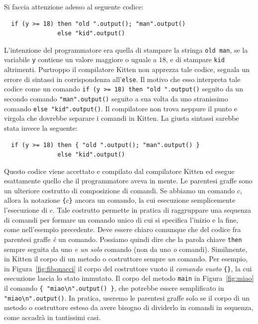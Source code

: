 Si faccia attenzione adesso al seguente codice:
%
\begin{verbatim}
  if (y >= 18) then "old ".output(); "man".output()
               else "kid".output()
\end{verbatim}
%
L'intenzione del programmatore era quella di stampare la stringa
\texttt{old man}, se la variabile \texttt{y} contiene un valore maggiore o
uguale a $18$, e di stampare \texttt{kid} altrimenti. Purtroppo il compilatore
Kitten non apprezza tale codice, \poiche segnala un errore di sintassi in corrispondenza
all'\texttt{else}. Il motivo \e che esso interpreta tale codice come
un comando \verb|if (y >= 18) then "old ".output()| seguito da
un secondo comando \verb|"man".output()| seguito a sua volta
da uno stranissimo comando
\verb|else "kid".output()|. Il compilatore non trova neppure il punto e virgola che
dovrebbe separare i comandi in Kitten. La giusta sintassi sarebbe stata
invece la seguente:
%
\begin{verbatim}
  if (y >= 18) then { "old ".output(); "man".output() }
               else "kid".output()
\end{verbatim}
%
Questo codice viene accettato e compilato dal compilatore Kitten ed esegue
esattamente quello che il programmatore aveva in mente. Le parentesi
graffe sono un ulteriore costrutto di composizione di comandi. Se abbiamo
un comando $c$, allora la notazione \texttt{\{}$c$\texttt{\}} \e ancora
un comando, la cui esecuzione \e semplicemente l'esecuzione di $c$.
Tale costrutto permette in pratica di raggruppare una sequenza di comandi
per formare un comando unico di cui si specifica l'inizio e la fine, come
nell'esempio precedente. Deve essere
chiaro comunque che del codice fra parentesi graffe \emph{\`e} un comando.
Possiamo quindi dire che la parola chiave \texttt{then} \e sempre seguita
da uno \emph{e un solo}
comando (non da uno \emph{o \piu} comandi). Similmente, in Kitten
il corpo di un metodo o costruttore \e sempre \emph{un} comando. Per esempio,
in Figura~\ref{fig:fibonacci} il corpo del costruttore vuoto \e il
\emph{comando vuoto} \verb|{}|, la cui esecuzione lascia lo stato immutato.
Il corpo del metodo \texttt{main} in Figura~\ref{fig:miao}
\e il comando \verb|{ "miao\n".output() }|,
che potrebbe essere semplificato in \verb|"miao\n".output()|. In pratica,
useremo le parentesi graffe solo se il corpo di un metodo o costruttore
\e \cosi esteso da avere bisogno di dividerlo in \piu comandi in sequenza,
come accadr\`a in tantissimi casi.
%
%
